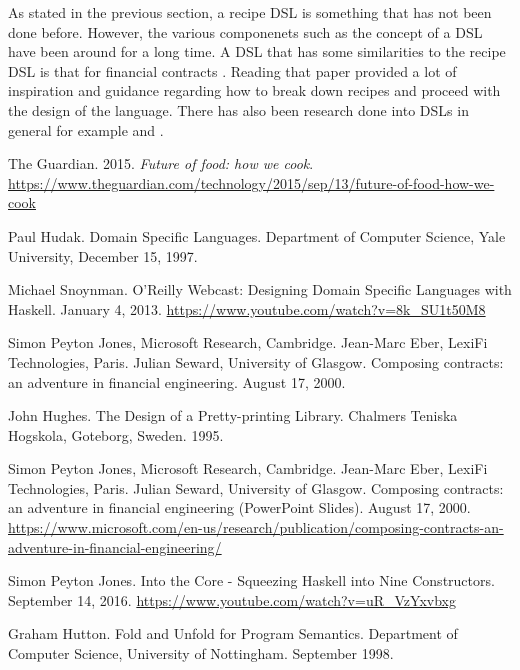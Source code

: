 \documentclass[11pt]{article}
\begin{document}
    As stated in the previous section, a recipe DSL is something that has not been done before.
    However, the various componenets such as the concept of a DSL have been around for a long time.
    A DSL that has some similarities to the recipe DSL is that for financial contracts \cite{contracts}.
    Reading that paper provided a lot of inspiration and guidance regarding how to break down recipes
    and proceed with the design of the language. There has also been research done into DSLs
    in general for example \cite{hudak} and \cite{snoyman}.

    \newpage
    \begin{thebibliography}{5}

        The Guardian. 2015. \textit{Future of food: how we cook}.
        \url{https://www.theguardian.com/technology/2015/sep/13/future-of-food-how-we-cook}

        Paul Hudak. Domain Specific Languages. Department of Computer
        Science, Yale University, December 15, 1997.

        Michael Snoynman. O'Reilly Webcast: Designing Domain Specific
        Languages with Haskell. January 4, 2013.
        \url{https://www.youtube.com/watch?v=8k_SU1t50M8}

        Simon Peyton Jones, Microsoft Research, Cambridge.
        Jean-Marc Eber, LexiFi Technologies, Paris. Julian Seward,
        University of Glasgow. Composing contracts: an adventure in
        financial engineering. August 17, 2000.

        John Hughes. The Design of a Pretty-printing Library.
        Chalmers Teniska Hogskola, Goteborg, Sweden. 1995.

        Simon Peyton Jones, Microsoft Research, Cambridge.
        Jean-Marc Eber, LexiFi Technologies, Paris. Julian Seward,
        University of Glasgow. Composing contracts: an adventure in
        financial engineering (PowerPoint Slides). August 17, 2000.
        \url{https://www.microsoft.com/en-us/research/publication/composing-contracts-an-adventure-in-financial-engineering/}

        Simon Peyton Jones. Into the Core - Squeezing Haskell into
        Nine Constructors. September 14, 2016.
        \url{https://www.youtube.com/watch?v=uR_VzYxvbxg}

        Graham Hutton. Fold and Unfold for Program Semantics. Department of
        Computer Science, University of Nottingham. September 1998.

    \end{thebibliography}   
\end{document}
